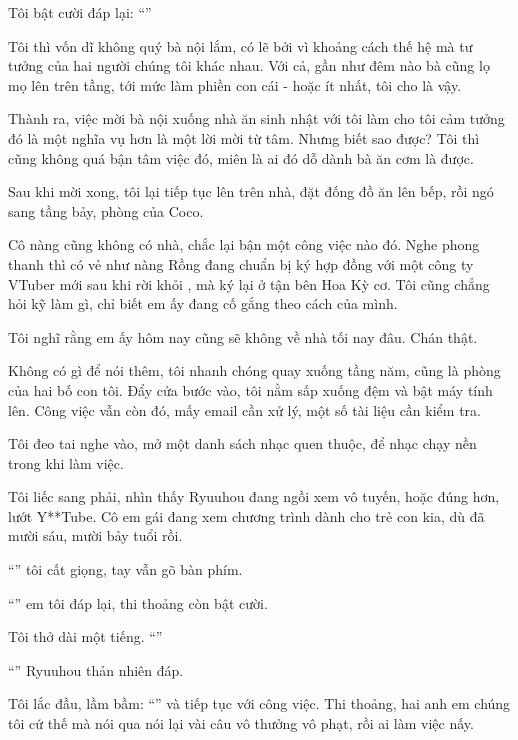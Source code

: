 \documentclass[../main.tex]{subfiles}
\begin{document}
Tôi bật cười đáp lại: ``''

Tôi thì vốn dĩ không quý bà nội lắm, có lẽ bởi vì khoảng cách thế hệ mà tư tưởng của hai người chúng tôi khác nhau. Với cả, gần như đêm nào bà cũng lọ mọ lên trên tầng, tới mức làm phiền con cái - hoặc ít nhất, tôi cho là vậy.

Thành ra, việc mời bà nội xuống nhà ăn sinh nhật với tôi làm cho tôi cảm tưởng đó là một nghĩa vụ hơn là một lời mời từ tâm. Nhưng biết sao được? Tôi thì cũng không quá bận tâm việc đó, miên là ai đó dỗ dành bà ăn cơm là được.

Sau khi mời xong, tôi lại tiếp tục lên trên nhà, đặt đống đồ ăn lên bếp, rồi ngó sang tầng bảy, phòng của Coco.

Cô nàng cũng không có nhà, chắc lại bận một công việc nào đó. Nghe phong thanh thì có vẻ như nàng Rồng đang chuẩn bị ký hợp đồng với một công ty VTuber mới sau khi rời khỏi \hll, mà ký lại ở tận bên Hoa Kỳ cơ. Tôi cũng chẳng hỏi kỹ làm gì, chỉ biết em ấy đang cố gắng theo cách của mình.

Tôi nghĩ rằng em ấy hôm nay cũng sẽ không về nhà tối nay đâu. Chán thật.

Không có gì để nói thêm, tôi nhanh chóng quay xuống tầng năm, cũng là phòng của hai bố con tôi. Đẩy cửa bước vào, tôi nằm sấp xuống đệm và bật máy tính lên. Công việc vẫn còn đó, mấy email cần xử lý, một số tài liệu cần kiểm tra.

Tôi đeo tai nghe vào, mở một danh sách nhạc quen thuộc, để nhạc chạy nền trong khi làm việc.

Tôi liếc sang phải, nhìn thấy Ryuuhou đang ngồi xem vô tuyến, hoặc đúng hơn, lướt Y**Tube. Cô em gái đang xem chương trình dành cho trẻ con kia, dù đã mười sáu, mười bảy tuổi rồi.

``'' tôi cất giọng, tay vẫn gõ bàn phím.

``'' em tôi đáp lại, thi thoảng còn bật cười.

Tôi thở dài một tiếng. ``''

``'' Ryuuhou thản nhiên đáp.

Tôi lắc đầu, lầm bầm: ``'' và tiếp tục với công việc. Thi thoảng, hai anh em chúng tôi cứ thế mà nói qua nói lại vài câu vô thưởng vô phạt, rồi ai làm việc nấy.
\end{document}
